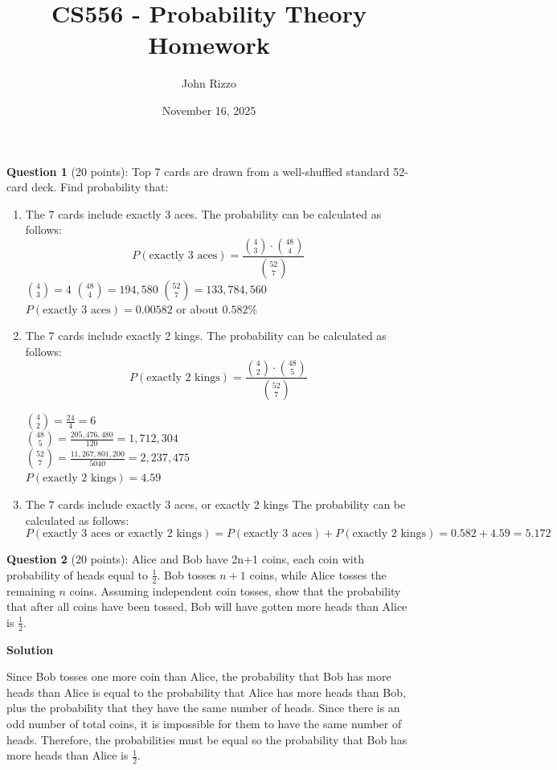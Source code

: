 \documentclass{article}
\title{CS556 - Probability Theory Homework}
\author{John Rizzo}
\date{November 16, 2025}
\begin{document}
\maketitle

\noindent
\textbf{Question 1} (20 points): 
Top 7 cards are drawn from a well-shuffled standard 52-card deck. Find probability that:
\begin{enumerate}
    \item The 7 cards include exactly 3 aces.
        The probability can be calculated as follows:
        \[P(\text{exactly 3 aces}) = \frac{\binom{4}{3} \cdot \binom{48}{4}}{\binom{52}{7}}\]
        $\binom{4}{3} = 4$
        $\binom{48}{4} = 194,580$
        $\binom{52}{7} = 133,784,560$
        $P(\text{exactly 3 aces}) = 0.00582$ or about $0.582\%$
    \item The 7 cards include exactly 2 kings.
        The probability can be calculated as follows:
        \[P(\text{exactly 2 kings}) = \frac{\binom{4}{2} \cdot \binom{48}{5}}{\binom{52}{7}}\]

        $\binom{4}{2} = \frac{24}{4} = 6$ \\
        $\binom{48}{5} = \frac{205,476,480}{120} = 1,712,304$ \\
        $\binom{52}{7} = \frac{11,267,801,200}{5040} = 2,237,475$ \\
        $P(\text{exactly 2 kings}) = 4.59$ \\
    \item The 7 cards include exactly 3 aces, or exactly 2 kings
        The probability can be calculated as follows:
        \[P(\text{exactly 3 aces or exactly 2 kings}) = P(\text{exactly 3 aces}) + P(\text{exactly 2 kings}) = 0.582 + 4.59 = 5.172 \]
\end{enumerate}


\vspace{1cm}
\noindent
\textbf{Question 2} (20 points): Alice and Bob have 2n+1 coins, each coin with probability of heads equal to $\frac{1}{2}$.  Bob tosses $n+1$ coins, while Alice tosses the remaining $n$ coins.  Assuming independent coin tosses, show that the probability that after all coins have been tossed, Bob will have gotten more heads than Alice is $\frac{1}{2}$.

\noindent
\textbf{Solution}

\noindent
Since Bob tosses one more coin than Alice, the probability that Bob has more heads than Alice is equal to the probability that Alice has more heads than Bob, plus the probability that they have the same number of heads. Since there is an odd number of total coins, it is impossible for them to have the same number of heads. Therefore, the probabilities must be equal so the probability that Bob has more heads than Alice is $\frac{1}{2}$.
\end{document}
